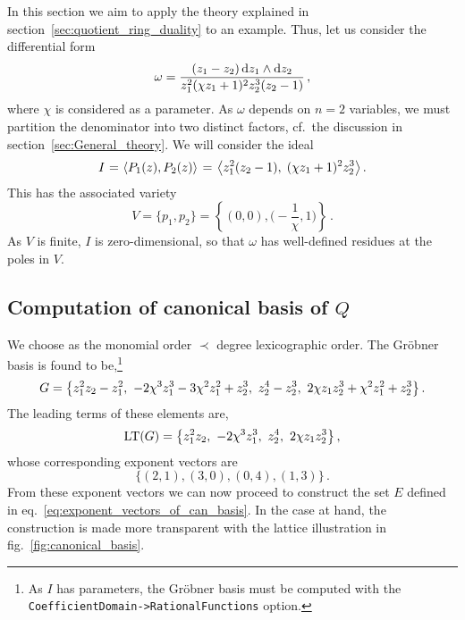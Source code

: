 \documentclass[dvipsnames,preprint,12pt,sort&compress]{elsarticle}
\def\d{{\rm d}}
\begin{document}
In this section we aim to apply the theory explained in
section~\ref{sec:quotient_ring_duality} to an example.
Thus, let us consider the differential form
\begin{equation}
\omega = \frac{(z_1 - z_2) \hspace{0.6mm} \d z_1 \wedge \d z_2}{z_1^2 (\chi  z_1 + 1)^2 z_2^3 (z_2-1)} \,,
\label{eq:diff_form_example}
\end{equation}
where $\chi$ is considered as a parameter. As $\omega$
depends on $n=2$ variables, we must partition
the denominator into two distinct factors, cf.~the discussion in
section~\ref{sec:General_theory}. We will consider the ideal
\begin{equation}
I \hspace{0.2mm}=\hspace{0.2mm} \langle P_1(z), P_2(z)\rangle
\hspace{0.4mm}=\hspace{0.4mm} \big\langle z_1^2 (z_2-1), \hspace{1mm} (\chi  z_1 + 1)^2 z_2^3 \big\rangle \,.
\label{eq:ideal_example}
\end{equation}
This has the associated variety
\begin{equation}
V = \{ p_1, p_2 \} = \left\{ (0,0), \big({-}\textstyle{\frac{1}{\chi}},1 \big) \right\} \,.
\label{eq:variety_example}
\end{equation}
As $V$ is finite, $I$ is zero-dimensional, so that $\omega$ has
well-defined residues at the poles in $V$.


\subsection{Computation of canonical basis of $Q$}
We choose as the monomial order $\prec$ degree lexicographic order.
The Gr{\"o}bner basis is found to be,\footnote{As $I$ has parameters,
the Gr{\"o}bner basis must be computed with the
\texttt{CoefficientDomain->RationalFunctions} option.}
\begin{equation}
G = \big\{ z_1^2 z_2 - z_1^2, \hspace{1.2mm}
-2 \chi^3 z_1^3 -3\chi^2 z_1^2 + z_2^3, \hspace{1.2mm}
z_2^4 - z_2^3, \hspace{1.2mm}
2\chi z_1 z_2^3 + \chi^2 z_1^2 + z_2^3 \big\} \,.
\label{eq:Groebner_basis_example}
\end{equation}
The leading terms of these elements are,
\begin{equation}
\mathrm{LT}(G) = \big\{ z_1^2 z_2, \hspace{1.2mm} -2 \chi ^3 z_1^3, \hspace{1.2mm} z_2^4, \hspace{1.2mm} 2\chi z_1 z_2^3 \big\} \,,
\end{equation}
whose corresponding exponent vectors are
\begin{equation}
\big\{ (2, 1), (3, 0), (0, 4), (1, 3) \big\} \,.
\end{equation}
From these exponent vectors we can now proceed to construct
the set $E$ defined in eq.~\eqref{eq:exponent_vectors_of_can_basis}.
In the case at hand, the construction is made more transparent
with the lattice illustration in fig.~\ref{fig:canonical_basis}.
\end{document}
